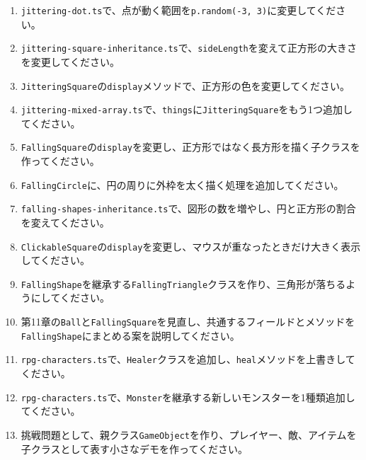 \begin{enumerate}
    \item \texttt{jittering-dot.ts}で、点が動く範囲を\texttt{p.random(-3, 3)}に変更してください。
    \item \texttt{jittering-square-inheritance.ts}で、\texttt{sideLength}を変えて正方形の大きさを変更してください。
    \item \texttt{JitteringSquare}の\texttt{display}メソッドで、正方形の色を変更してください。
    \item \texttt{jittering-mixed-array.ts}で、\texttt{things}に\texttt{JitteringSquare}をもう1つ追加してください。
    \item \texttt{FallingSquare}の\texttt{display}を変更し、正方形ではなく長方形を描く子クラスを作ってください。
    \item \texttt{FallingCircle}に、円の周りに外枠を太く描く処理を追加してください。
    \item \texttt{falling-shapes-inheritance.ts}で、図形の数を増やし、円と正方形の割合を変えてください。
    \item \texttt{ClickableSquare}の\texttt{display}を変更し、マウスが重なったときだけ大きく表示してください。
    \item \texttt{FallingShape}を継承する\texttt{FallingTriangle}クラスを作り、三角形が落ちるようにしてください。
    \item 第11章の\texttt{Ball}と\texttt{FallingSquare}を見直し、共通するフィールドとメソッドを\texttt{FallingShape}にまとめる案を説明してください。
    \item \texttt{rpg-characters.ts}で、\texttt{Healer}クラスを追加し、\texttt{heal}メソッドを上書きしてください。
    \item \texttt{rpg-characters.ts}で、\texttt{Monster}を継承する新しいモンスターを1種類追加してください。
    \item 挑戦問題として、親クラス\texttt{GameObject}を作り、プレイヤー、敵、アイテムを子クラスとして表す小さなデモを作ってください。
\end{enumerate}
